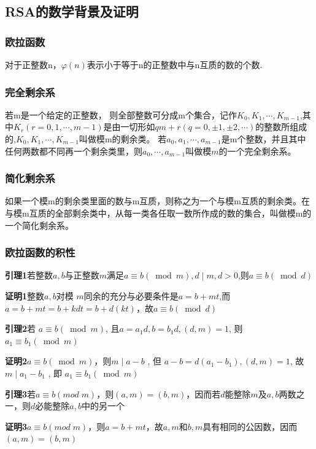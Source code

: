 \documentclass[12pt,hyperref,a4paper,UTF8]{ctexart}
\begin{document}
\subsection{RSA的数学背景及证明}
\subsubsection{欧拉函数}
对于正整数n，$\varphi(n)$表示小于等于n的正整数中与n互质的数的个数.

\subsubsection{完全剩余系}
若m是一个给定的正整数， 则全部整数可分成m个集合，记作$K_0,K_1,\cdots,K_{m-1}$,其中$K_r(r=0,1,\cdots,m-1)$是由一切形如$qm+r(q=0,\pm1,\pm2,\cdots)$的整数所组成的,$K_0,K_1,\cdots,K_{m-1}$叫做模m的剩余类。
若$a_0,a_1,\cdots,a_{m-1}$是m个整数，并且其中任何两数都不同再一个剩余类里，则$a_0,\cdots,a_{m-1}$叫做模$m$的一个完全剩余系。


\subsubsection{简化剩余系}
如果一个模m的剩余类里面的数与m互质，则称之为一个与模m互质的剩余类。在与模m互质的全部剩余类中，从每一类各任取一数所作成的数的集合，叫做模m的一个简化剩余系。


\subsubsection{欧拉函数的积性}

\textbf{引理1}\quad 若整数$a,b$与正整数$m$满足$a \equiv b(\bmod m), d \mid m, d>0 $,则$a \equiv b(\bmod d) $\par
\vskip 2pt
\textbf{证明1}\quad 整数$  a, b  $对模 $ m  $同余的充分与必要条件是$a=b+m t$,而$a=b+mt=b+kdt=b+d(kt)$，故$a \equiv b(\bmod d) $\par
\vskip 12pt

\textbf{引理2}\quad 若 $ a \equiv b(\bmod m) $, $且  a=a_{1} d, b=b_{1} d,(d, m)=1 $, 则 $ a_{1} \equiv b_{1}(\bmod m) $\par
\vskip 2pt
\textbf{证明2}\quad $ a \equiv b(\bmod m) $，则$ m \mid a-b$ , 但  $a-b=d\left(a_{1}-b_{1}\right),(d, m)=1 $, 故 $ m \mid a_{1}-b_{1}$ , 即  $a_{1} \equiv b_{1}(\bmod m)$\par
\vskip 12pt

\textbf{引理3}\quad 若$a\equiv b(mod\;m)$，则$(a,m)=(b,m)$，因而若$d$能整除$m$及$a,b$两数之一，则$d$必能整除$a,b$中的另一个\par 
\vskip 2pt
\textbf{证明3}\quad $a\equiv b(mod\;m)$，则$a=b+m t$，故$a,m和b,m$具有相同的公因数，因而$(a,m)=(b,m)$\par 
\vskip 12pt
\end{document}
